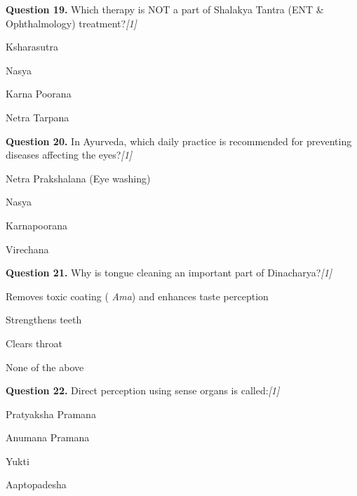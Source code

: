 \documentclass[11pt,a4paper]{article}
\newcommand{\pts}[1]{\hfill   \textit{[#1]}}
\begin{document}
\medskip




\noindent   \textbf{Question 19.} Which therapy is NOT a part of Shalakya Tantra (ENT \& Ophthalmology) treatment?\pts{1}

\begin{parts}
  \item Ksharasutra
  \item Nasya
  \item Karna Poorana
  \item Netra Tarpana
\end{parts}

\medskip




\noindent   \textbf{Question 20.} In Ayurveda, which daily practice is recommended for preventing diseases affecting the eyes?\pts{1}

\begin{parts}
  \item Netra Prakshalana (Eye washing)
  \item Nasya
  \item Karnapoorana
  \item Virechana
\end{parts}

\medskip




\noindent   \textbf{Question 21.} Why is tongue cleaning an important part of Dinacharya?\pts{1}

\begin{parts}
  \item Removes toxic coating (   \textit{Ama}) and enhances taste perception
  \item Strengthens teeth
  \item Clears throat
  \item None of the above
\end{parts}

\medskip




\noindent   \textbf{Question 22.} Direct perception using sense organs is called:\pts{1}

\begin{parts}
  \item Pratyaksha Pramana
  \item Anumana Pramana
  \item Yukti
  \item Aaptopadesha
\end{parts}
\end{document}
